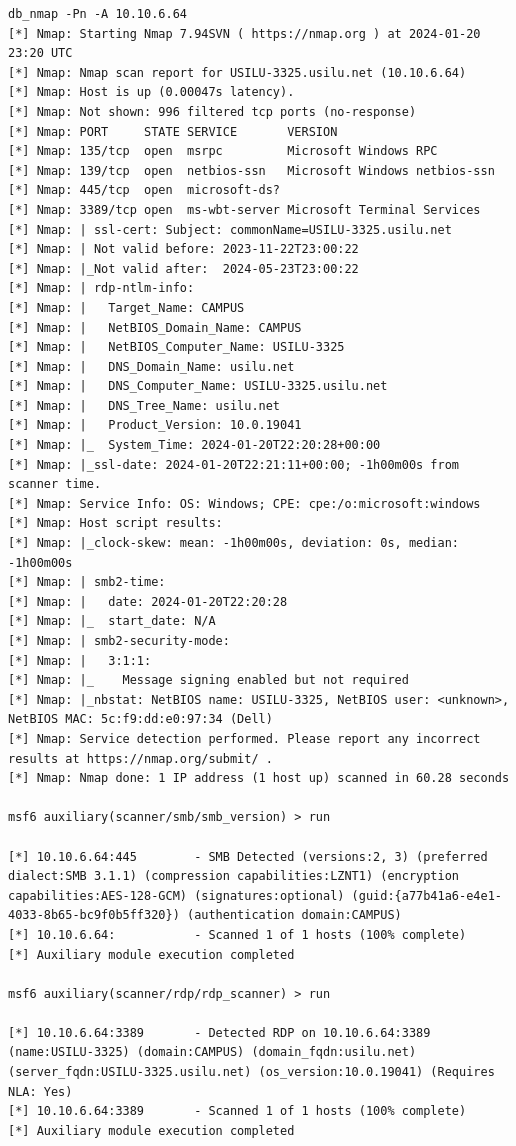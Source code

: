 \documentclass[mscthesis]{usiinfthesis}
\begin{document}
\begin{lstlisting}[language={},breaklines=true,postbreak=\mbox{\textcolor{red}{$\hookrightarrow$}\space}]
db_nmap -Pn -A 10.10.6.64
[*] Nmap: Starting Nmap 7.94SVN ( https://nmap.org ) at 2024-01-20 23:20 UTC
[*] Nmap: Nmap scan report for USILU-3325.usilu.net (10.10.6.64)
[*] Nmap: Host is up (0.00047s latency).
[*] Nmap: Not shown: 996 filtered tcp ports (no-response)
[*] Nmap: PORT     STATE SERVICE       VERSION
[*] Nmap: 135/tcp  open  msrpc         Microsoft Windows RPC
[*] Nmap: 139/tcp  open  netbios-ssn   Microsoft Windows netbios-ssn
[*] Nmap: 445/tcp  open  microsoft-ds?
[*] Nmap: 3389/tcp open  ms-wbt-server Microsoft Terminal Services
[*] Nmap: | ssl-cert: Subject: commonName=USILU-3325.usilu.net
[*] Nmap: | Not valid before: 2023-11-22T23:00:22
[*] Nmap: |_Not valid after:  2024-05-23T23:00:22
[*] Nmap: | rdp-ntlm-info:
[*] Nmap: |   Target_Name: CAMPUS
[*] Nmap: |   NetBIOS_Domain_Name: CAMPUS
[*] Nmap: |   NetBIOS_Computer_Name: USILU-3325
[*] Nmap: |   DNS_Domain_Name: usilu.net
[*] Nmap: |   DNS_Computer_Name: USILU-3325.usilu.net
[*] Nmap: |   DNS_Tree_Name: usilu.net
[*] Nmap: |   Product_Version: 10.0.19041
[*] Nmap: |_  System_Time: 2024-01-20T22:20:28+00:00
[*] Nmap: |_ssl-date: 2024-01-20T22:21:11+00:00; -1h00m00s from scanner time.
[*] Nmap: Service Info: OS: Windows; CPE: cpe:/o:microsoft:windows
[*] Nmap: Host script results:
[*] Nmap: |_clock-skew: mean: -1h00m00s, deviation: 0s, median: -1h00m00s
[*] Nmap: | smb2-time:
[*] Nmap: |   date: 2024-01-20T22:20:28
[*] Nmap: |_  start_date: N/A
[*] Nmap: | smb2-security-mode:
[*] Nmap: |   3:1:1:
[*] Nmap: |_    Message signing enabled but not required
[*] Nmap: |_nbstat: NetBIOS name: USILU-3325, NetBIOS user: <unknown>, NetBIOS MAC: 5c:f9:dd:e0:97:34 (Dell)
[*] Nmap: Service detection performed. Please report any incorrect results at https://nmap.org/submit/ .
[*] Nmap: Nmap done: 1 IP address (1 host up) scanned in 60.28 seconds

msf6 auxiliary(scanner/smb/smb_version) > run

[*] 10.10.6.64:445        - SMB Detected (versions:2, 3) (preferred dialect:SMB 3.1.1) (compression capabilities:LZNT1) (encryption capabilities:AES-128-GCM) (signatures:optional) (guid:{a77b41a6-e4e1-4033-8b65-bc9f0b5ff320}) (authentication domain:CAMPUS)
[*] 10.10.6.64:           - Scanned 1 of 1 hosts (100% complete)
[*] Auxiliary module execution completed

msf6 auxiliary(scanner/rdp/rdp_scanner) > run

[*] 10.10.6.64:3389       - Detected RDP on 10.10.6.64:3389       (name:USILU-3325) (domain:CAMPUS) (domain_fqdn:usilu.net) (server_fqdn:USILU-3325.usilu.net) (os_version:10.0.19041) (Requires NLA: Yes)
[*] 10.10.6.64:3389       - Scanned 1 of 1 hosts (100% complete)
[*] Auxiliary module execution completed


\end{lstlisting}
\end{document}
